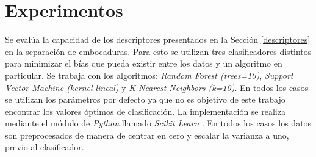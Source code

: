 \documentclass{article}
\begin{document}
%
%
%
%
%
   
\section{Experimentos}

Se evalúa la capacidad de los descriptores presentados en la Sección \ref{descriptores} en la separación de embocaduras. Para esto se utilizan tres clasificadores distintos para minimizar el bías que pueda existir entre los datos y un algoritmo en particular. Se trabaja con los algoritmos: \textit{Random Forest (trees=10)}, \textit{Support Vector Machine (kernel lineal)} y \textit{K-Nearest Neighbors (k=10)}. En todos los casos se utilizan los parámetros por defecto ya que no es objetivo de este trabajo encontrar los valores óptimos de clasificación. La implementación se realiza mediante el módulo de \textit{Python} llamado \textit{Scikit Learn} \citep{pedregosa2011scikit}. En todos los casos los datos son preprocesados de manera de centrar en cero y escalar la varianza a uno, previo al clasificador.
\medskip
\end{document}
